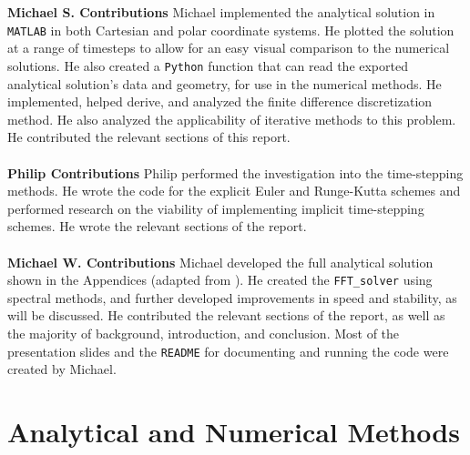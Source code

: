 \documentclass{homework}
\begin{document}
\\ \\
\noindent \textbf{Michael S. Contributions} 
Michael implemented the analytical solution in \texttt{MATLAB} in both Cartesian and polar coordinate systems. He plotted the solution at a range of timesteps to allow for an easy visual comparison to the numerical solutions. He also created a \texttt{Python} function that can read the exported analytical solution's data and geometry, for use in the numerical methods. He implemented, helped derive, and analyzed the finite difference discretization method. He also analyzed the applicability of iterative methods to this problem. He contributed the relevant sections of this report.
\\ \\
\noindent \textbf{Philip Contributions}
Philip performed the investigation into the time-stepping methods. He wrote the code for the explicit Euler and Runge-Kutta schemes and performed research on the viability of implementing implicit time-stepping schemes. He wrote the relevant sections of the report. 
\\ \\
\noindent \textbf{Michael W. Contributions}
Michael developed the full analytical solution shown in the Appendices (adapted from \cite{MAE501}). He created the \texttt{FFT\_solver} using spectral methods, and further developed improvements in speed and stability, as will be discussed. He contributed the relevant sections of the report, as well as the majority of background, introduction, and conclusion. Most of the presentation slides and the \texttt{README} for documenting and running the code were created by Michael.

\section{\textbf{Analytical and Numerical Methods}}
\end{document}
